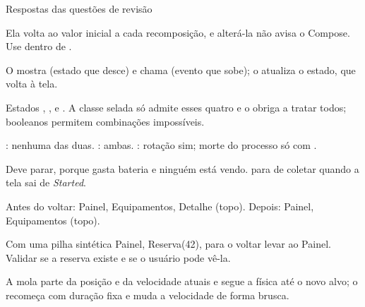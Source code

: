\documentclass[aspectratio=169,10pt]{beamer}
\begin{document}
\begin{frame}{Respostas das questões de revisão}
  \begin{respostas}
    \item Ela volta ao valor inicial a cada recomposição, e alterá-la não avisa o Compose. Use  dentro de .
    \item O  mostra  (estado que desce) e chama  (evento que sobe); o  atualiza o estado, que volta à tela.
    \item Estados , ,  e . A classe selada só admite esses quatro e o  obriga a tratar todos; booleanos permitem combinações impossíveis.
    \item {}: nenhuma das duas. : ambas. : rotação sim; morte do processo só com .
    \item Deve parar, porque gasta bateria e ninguém está vendo.  para de coletar quando a tela sai de \emph{Started}.
    \item Antes do voltar: Painel, Equipamentos, Detalhe (topo). Depois: Painel, Equipamentos (topo).
    \item Com uma pilha sintética Painel, Reserva(42), para o voltar levar ao Painel. Validar se a reserva existe e se o usuário pode vê-la.
    \item A mola parte da posição e da velocidade atuais e segue a física até o novo alvo; o  recomeça com duração fixa e muda a velocidade de forma brusca.
  \end{respostas}
\end{frame}

\end{document}
